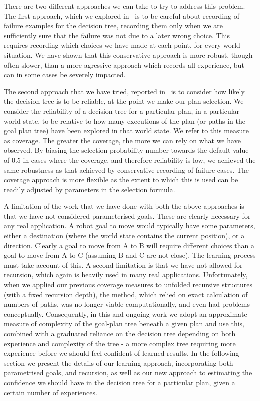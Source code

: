 There are two different approaches we can take to try to address this
problem. The first approach, which we explored
in~\cite{Airiau:IJAT:09} is to be careful about recording of failure
examples for the decision tree, recording them only when we are
sufficiently sure that the failure was not due to a later wrong
choice. This requires recording which choices we have made at each
point, for every world situation. We have shown that this conservative
approach is more robust, though often slower, than a more agressive
approach which records all experience, but can in some cases be
severely impacted.

The second approach that we have tried, reported in~\cite{Singh:AAMAS10} is to
consider how likely the decision tree is to be reliable, at the point
we make our plan selection.  We consider the reliability of a decision
tree for a particular plan, in a particular world state, to be
relative to how many executions of the plan (or paths in the goal plan
tree) have been explored in that world state. We refer to this measure
as coverage. The greater the coverage, the more we can rely on what we
have observed.  By biasing the selection probability number towards
the default value of 0.5 in cases where the coverage, and therefore
reliability is low, we achieved the same robustness as that
achieved by conservative recording of failure cases. The coverage
approach is more flexible as the extent to which this is used can be
readily adjusted by parameters in the selection formula. 

A limitation of the work that we have done with both the above
approaches is that we have not considered parameterised goals. These
are clearly necessary for any real application.  A robot goal to move
would typically have some parameters, either a destination (where the
world state contains the current position), or a direction. Clearly a
goal to move from A to B will require different choices than a goal to
move from A to C (assuming B and C are not close). The learning
process must take account of this.  A second limitation is that we
have not allowed for recursion, which again is heavily used in many
real applications. Unfortunately, when we applied our previous
coverage measures to unfolded recursive structures (with a fixed
recursion depth), the method, which relied on exact calculation of
numbers of paths, was no longer viable computationally, and even had
problems conceptually. Consequently, in this and ongoing work we adopt
an approximate measure of complexity of the goal-plan tree beneath a
given plan and use this, combined with a graduated reliance on the
decision tree depending on both experience and complexity of the tree
- a more complex tree requiring more experience before we should feel
confident of learned results.
%
In the following section we present the details of our learning
approach, incorporating both parametrised goals, and recursion, as
well as our new approach to estimating the confidence we should have in
the decision tree for a particular plan, given a certain number of
experiences. 









